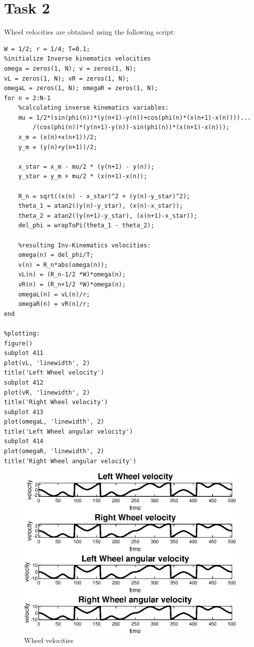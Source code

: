 \documentclass[12pt,letterpaper]{article}
\begin{document}
\section*{Task 2}
Wheel velocities are obtained using the following script: 
\begin{lstlisting}
W = 1/2; r = 1/4; T=0.1; 
%initialize Inverse kinematics velocities
omega = zeros(1, N); v = zeros(1, N); 
vL = zeros(1, N); vR = zeros(1, N); 
omegaL = zeros(1, N); omegaR = zeros(1, N); 
for n = 2:N-1
    %calculating inverse kinematics variables: 
    mu = 1/2*(sin(phi(n))*(y(n+1)-y(n))+cos(phi(n)*(x(n+1)-x(n))))...
        /(cos(phi(n))*(y(n+1)-y(n))-sin(phi(n))*(x(n+1)-x(n))); 
    x_m = (x(n)+x(n+1))/2; 
    y_m = (y(n)+y(n+1))/2; 
    
    x_star = x_m - mu/2 * (y(n+1) - y(n)); 
    y_star = y_m + mu/2 * (x(n+1)-x(n)); 
    
    R_n = sqrt((x(n) - x_star)^2 + (y(n)-y_star)^2); 
    theta_1 = atan2((y(n)-y_star), (x(n)-x_star)); 
    theta_2 = atan2((y(n+1)-y_star), (x(n+1)-x_star)); 
    del_phi = wrapToPi(theta_1 - theta_2); 
    
    %resulting Inv-Kinematics velocities: 
    omega(n) = del_phi/T; 
    v(n) = R_n*abs(omega(n));  
    vL(n) = (R_n-1/2 *W)*omega(n); 
    vR(n) = (R_n+1/2 *W)*omega(n); 
    omegaL(n) = vL(n)/r; 
    omegaR(n) = vR(n)/r; 
end

%plotting: 
figure()
subplot 411
plot(vL, 'linewidth', 2)
title('Left Wheel velocity')
subplot 412
plot(vR, 'linewidth', 2)
title('Right Wheel velocity')
subplot 413
plot(omegaL, 'linewidth', 2)
title('Left Wheel angular velocity')
subplot 414
plot(omegaR, 'linewidth', 2)
title('Right Wheel angular velocity')
\end{lstlisting}
\begin{figure} [h]
    \centering
    \includegraphics[]{figures/task2.eps}
    \caption{Wheel velocities}
    \label{fig:my_label}
\end{figure}
\end{document}
